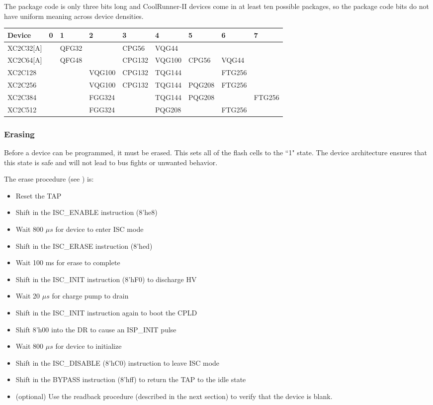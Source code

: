\documentclass[pdftex,letterpaper]{article}
\begin{document}
The package code is only three bits long and CoolRunner-II devices come in at least ten possible packages, so the 
package code bits do not have uniform meaning across device densities.

\begin{longtabu} to \linewidth {|l|l|l|l|l|l|l|l|l|}
\hline
{\bf Device} & {\bf 0} & {\bf 1} & {\bf 2} & {\bf 3} & {\bf 4} & {\bf 5} & {\bf 6} & {\bf 7} \\
\hline
XC2C32[A] & & QFG32 & & CPG56 & VQG44 & & & \\
\hline
XC2C64[A] & & QFG48 & & CPG132 & VQG100 & CPG56 & VQG44 & \\
\hline
XC2C128 & & & VQG100 & CPG132 & TQG144 & & FTG256 & \\
\hline
XC2C256 & & & VQG100 & CPG132 & TQG144 & PQG208 & FTG256 & \\
\hline
XC2C384 & & & FGG324 & & TQG144 & PQG208 & & FTG256 \\
\hline
XC2C512 & & & FGG324 & & PQG208 & & FTG256 & \\
\hline
\end{longtabu}

\subsubsection{Erasing}

Before a device can be programmed, it must be erased. This sets all of the flash cells to the ``1" state. The 
device architecture ensures that this state is safe and will not lead to bus fights or unwanted behavior.

The erase procedure (see \cite{progspec}) is:
\begin{itemize}
\item Reset the TAP
\item Shift in the ISC\_ENABLE instruction (8'he8)
\item Wait 800 $\mu s$ for device to enter ISC mode
\item Shift in the ISC\_ERASE instruction (8'hed)
\item Wait 100 ms for erase to complete
\item Shift in the ISC\_INIT instruction (8'hF0) to discharge HV
\item Wait 20 $\mu s$ for charge pump to drain
\item Shift in the ISC\_INIT instruction again to boot the CPLD
\item Shift 8'h00 into the DR to cause an ISP\_INIT pulse
\item Wait 800 $\mu s$ for device to initialize
\item Shift in the ISC\_DISABLE (8'hC0) instruction to leave ISC mode
\item Shift in the BYPASS instruction (8'hff) to return the TAP to the idle state
\item (optional) Use the readback procedure (described in the next section) to verify that the device is blank.
\end{itemize}
\end{document}
